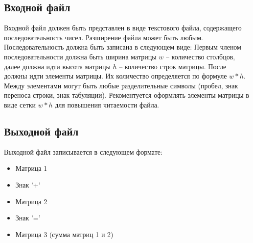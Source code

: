 \subsection*{Входной файл}

Входной файл должен быть представлен в виде текстового файла, содержащего последовательность чисел.
Разширение файла может быть любым.
Последовательность должна быть записана в следующем виде:
Первым членом последовательности должна быть ширина матрицы $ w $ -- количество столбцов,
далее должна идти высота матрицы $ h $ -- количество строк матрицы.
После должны идти элементы матрицы.
Их количество определяется по формуле $ w*h $.
Между элементами могут быть любые разделительные символы
(пробел, знак переноса строки, знак табуляции).
Рекоментуется оформлять элементы
матрицы в виде сетки $ w*h $ для повышения читаемости файла.

\subsection*{Выходной файл}

Выходной файл записывается в следующем формате:

\begin{itemize}
	\item Матрица 1
	\item Знак '+'
	\item Матрица 2
	\item Знак '='
	\item Матрица 3 (сумма матриц 1 и 2)
\end{itemize}